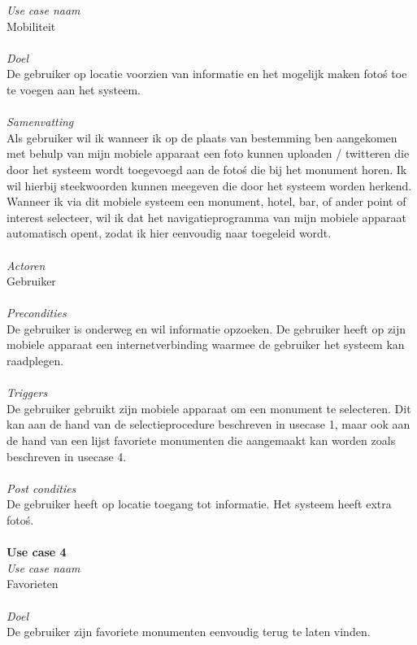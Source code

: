 \documentclass[a4paper,10pt]{article}
\begin{document}
			\textit{Use case naam}\\
			Mobiliteit\\ \\
			\textit{Doel}\\
			De gebruiker op locatie voorzien van informatie en het mogelijk maken foto\'s toe te voegen aan het systeem.\\ \\
			\textit{Samenvatting}\\
			Als gebruiker wil ik wanneer ik op de plaats van bestemming ben aangekomen met behulp van mijn mobiele apparaat een foto kunnen uploaden / twitteren die door het systeem wordt toegevoegd aan de foto\'s die bij het monument horen. Ik wil hierbij steekwoorden kunnen meegeven die door het systeem worden herkend. Wanneer ik via dit mobiele systeem een monument, hotel, bar, of ander point of interest selecteer, wil ik dat het navigatieprogramma van mijn mobiele apparaat automatisch opent, zodat ik hier eenvoudig naar toegeleid wordt.\\ \\
			\textit{Actoren}\\
			Gebruiker\\ \\
			\textit{Precondities}\\
			De gebruiker is onderweg en wil informatie opzoeken. De gebruiker heeft op zijn mobiele apparaat een internetverbinding waarmee de gebruiker het systeem kan raadplegen.\\ \\
			\textit{Triggers}\\
			De gebruiker gebruikt zijn mobiele apparaat om een monument te selecteren. Dit kan aan de hand van de selectieprocedure beschreven in usecase 1, maar ook aan de hand van een lijst favoriete monumenten die aangemaakt kan worden zoals beschreven in usecase 4.\\ \\
			\textit{Post condities}\\
			De gebruiker heeft op locatie toegang tot informatie. Het systeem heeft extra foto\'s.\\ \\
			\textbf{Use case 4}\\
			\textit{Use case naam}\\
			Favorieten\\ \\
			\textit{Doel}\\
			De gebruiker zijn favoriete monumenten eenvoudig terug te laten vinden.\\ \\
\end{document}
